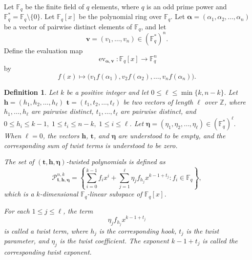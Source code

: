 \documentclass[12pt,draftcls,journal,onecolumn]{IEEEtran}
\newtheorem{definition}[theorem]{Definition}
\newcommand{\F}{{\mathbb{F}}}
\begin{document}
\renewcommand{\thetheorem}{\arabic{section}.\arabic{theorem}}
\setcounter{theorem}{0}

Let $\F_q$ be the finite field of $q$ elements, where $q$ is an odd prime power and $\F_q^*=\F_q\setminus\{0\}$. Let $\F_q[x]$ be the polynomial ring over $\F_q$.
Let
$
\boldsymbol{\alpha}=(\alpha_1,\alpha_2,\ldots,\alpha_n)
$
be a vector of pairwise distinct elements of $\F_q$, and let
\[
\boldsymbol{v}
=
(v_1,\ldots,v_n)\in(\F_q^*)^n.
\]
Define the evaluation map
\[
\operatorname{ev}_{\boldsymbol{\alpha},\boldsymbol{v}}
:\F_q[x]\longrightarrow\F_q^n
\]
by
\[
f(x)\longmapsto\bigl(v_1f(\alpha_1),v_2f(\alpha_2),\ldots,v_nf(\alpha_n)\bigr).
\]
\begin{definition}
Let \(k\) be a positive integer and let \(0\le \ell\le \min\{k,n-k\}. \)
Let \(\mathbf{h} = (h_1, h_2, \ldots, h_\ell)\)  \(\mathbf{t} = (t_1, t_2, \ldots, t_\ell)\)
be two vectors of length \(\ell\) over \(\mathbb{Z}\), where
\(h_1,\ldots,h_\ell\) are pairwise distinct,
\(t_1,\ldots,t_\ell\) are pairwise distinct, and
\(0\le h_i\le k-1,\; 1\le t_i\le n-k,\; 1\le i\le \ell\).
Let
\(\boldsymbol{\eta}
=(\eta_1,\eta_2,\ldots,\eta_\ell)
\in(\F_q^*)^\ell.\)
When \(\ell=0\), the vectors
\(\mathbf{h}\), \(\boldsymbol{t}\), and \(\boldsymbol{\eta}\)
are understood to be empty, and the corresponding sum of twist terms
is understood to be zero.

The set of
\((\boldsymbol{t},\mathbf{h},\boldsymbol{\eta})\)-twisted
polynomials is defined as
\[
\mathcal{P}_{\boldsymbol{t},\mathbf{h},\boldsymbol{\eta}}^{n,k}
=
\left\{
\sum_{i=0}^{k-1}f_i x^i
+
\sum_{j=1}^{\ell}
\eta_j f_{h_j}x^{k-1+t_j}
:
f_i\in\F_q
\right\},
\]
which is a \(k\)-dimensional \(\F_q\)-linear subspace of
\(\F_q[x]\).

For each \(1\le j\le\ell\), the term
\[
\eta_j f_{h_j}x^{k-1+t_j}
\]
is called a twist term, where \(h_j\) is the corresponding hook,
\(t_j\) is the twist parameter, and \(\eta_j\) is the twist
coefficient. The exponent \(k-1+t_j\) is called the corresponding
twist exponent.
\end{definition}
\end{document}
